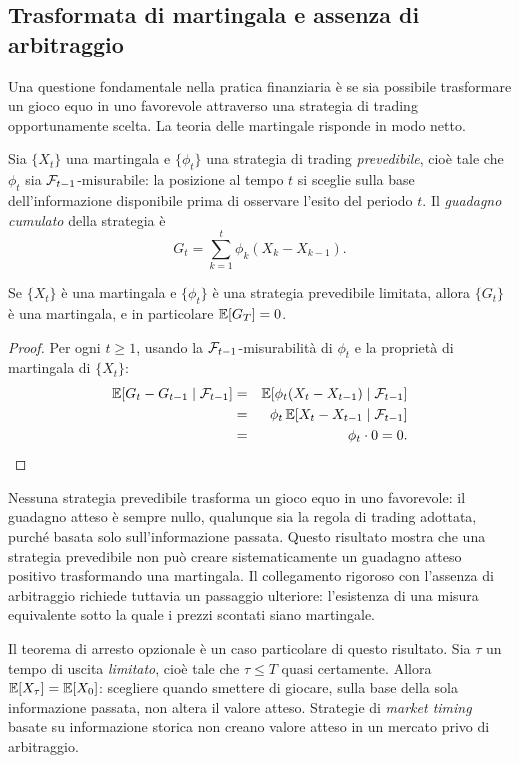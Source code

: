 \subsection{Trasformata di martingala e assenza di arbitraggio}

Una questione fondamentale nella pratica finanziaria \`{e} se
sia possibile trasformare un gioco equo in uno favorevole
attraverso una strategia di trading opportunamente scelta.
La teoria delle martingale risponde in modo netto.

Sia $\{X_t\}$ una martingala e $\{\phi_t\}$ una strategia di
trading \emph{prevedibile}, cio\`{e} tale che $\phi_t$ sia
$\mathcal{F}_{t-1}$-misurabile: la posizione al tempo $t$ si sceglie
sulla base dell'informazione disponibile prima di osservare
l'esito del periodo $t$. Il \emph{guadagno cumulato} della
strategia \`{e}
\[
G_t=\sum_{k=1}^{t}\phi_k(X_k-X_{k-1}).
\]

\begin{proposition}
\label{prop:trasformata}
Se $\{X_t\}$ \`{e} una martingala e $\{\phi_t\}$ \`{e} una
strategia prevedibile limitata, allora $\{G_t\}$ \`{e} una
martingala, e in particolare $\mathbb{E}[G_T]=0$.
\end{proposition}

\begin{proof}
Per ogni $t\geq 1$, usando la $\mathcal{F}_{t-1}$-misurabilit\`{a}
di $\phi_t$ e la propriet\`{a} di martingala di $\{X_t\}$:
\begin{eqnarray*}
\mathbb{E}[G_t-G_{t-1}\mid\mathcal{F}_{t-1}]
&=& \mathbb{E}[\phi_t(X_t-X_{t-1})\mid\mathcal{F}_{t-1}]\\
&=& \phi_t\,\mathbb{E}[X_t-X_{t-1}\mid\mathcal{F}_{t-1}]\\
&=& \phi_t\cdot 0=0.
\end{eqnarray*}
\end{proof}

Nessuna strategia prevedibile trasforma un gioco equo in uno
favorevole: il guadagno atteso \`{e} sempre nullo, qualunque
sia la regola di trading adottata, purch\'{e} basata solo
sull'informazione passata. Questo risultato mostra che una strategia prevedibile non pu\`{o}
creare sistematicamente un guadagno atteso positivo trasformando
una martingala. Il collegamento rigoroso con l'assenza di arbitraggio
richiede tuttavia un passaggio ulteriore: l'esistenza di una misura
equivalente sotto la quale i prezzi scontati siano martingale.

\begin{remark}
Il teorema di arresto opzionale \`{e} un caso particolare
di questo risultato. Sia $\tau$ un tempo di uscita
\emph{limitato}, cio\`{e} tale che $\tau\leq T$ quasi
certamente. Allora $\mathbb{E}[X_\tau]=\mathbb{E}[X_0]$: scegliere quando
smettere di giocare, sulla base della sola informazione
passata, non altera il valore atteso. Strategie di
\emph{market timing} basate su informazione storica non
creano valore atteso in un mercato privo di arbitraggio.
\end{remark}

